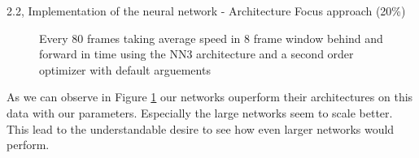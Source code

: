 \begin{task}{2.2, Implementation of the neural network - Architecture Focus approach (20\%)}
\begin{figure}
    \centering
    \caption{Every 80 frames taking average speed in 8 frame window behind and forward in time using the NN3 architecture and a second order optimizer with default arguements}
    \label{fig:secoroffshelf}
\end{figure}

As we can observe in Figure \ref{fig:secoroffshelf} our networks ouperform their architectures on this data with our parameters. Especially the large networks seem to scale better. This lead to the understandable desire to see how even larger networks would perform.


\end{task}
